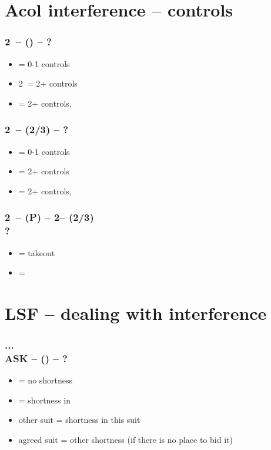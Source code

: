 \section{\texorpdfstring{Acol interference -- controls}{acolControlsInterference}}\label{sec:acolControlsInterference}

\subsubsection*{2\clubs\ -- (\dbl) -- ?}
\begin{itemize}
    \item \rdbl = 0-1 controls
    \item 2\hearts\ = 2+ controls
    \item {} = 2+ controls, \nat
\end{itemize}

\subsubsection*{2\clubs\ -- (2/3) -- ?}
\begin{itemize}
    \item \dbl = 0-1 controls
    \item \pass = 2+ controls
    \item {} = 2+ controls, \nat
\end{itemize}

\subsubsection*{2\clubs\ -- (P) -- 2\diams -- (2/3)\\
                ?}
\begin{itemize}
    \item \dbl = takeout
    \item \pass = \then \dbl
\end{itemize}

\section{\texorpdfstring{LSF -- dealing with interference}{askLSFinterference}}\label{sec:askLSFinterference}

\subsubsection*{...\\{\color{WildStrawberry}\textbf{ASK}\color{black}} -- (\anysuit{\textbullet}) -- ?}
\begin{itemize}
    \item \dbl = no shortness
    \item \pass = shortness in \anysuit{\textbullet}
    \item other suit = shortness in this suit
    \item agreed suit = other shortness (if there is no place to bid it)
\end{itemize}

